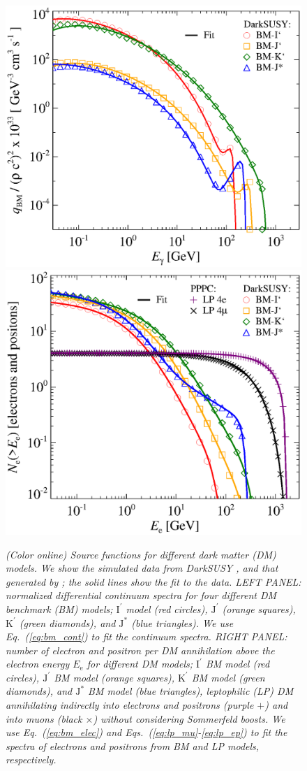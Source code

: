 \documentclass[10pt,aps,pra,reprint,amsmath,amsfonts,amssymb,showpacs,nofootinbib,floatfix]{revtex4-1}
\newcommand{\rmn}{\mathrm}
\newcommand{\ee}{E_\rmn{e}}
\newcommand{\Kp}{\rmn{K}^\prime}
\newcommand{\Ip}{\rmn{I}^\prime}
\newcommand{\Js}{\rmn{J}^*}
\newcommand{\Jp}{\rmn{J}^\prime}
\begin{document}
\begin{figure}
\begin{minipage}{2.0\columnwidth}
 \includegraphics[width=0.49\columnwidth]{figures/fit.ds.flux.bw.eps}
 \includegraphics[width=0.49\columnwidth]{figures/fit.epflux.int.bw.eps}
 \caption{\it (Color online) Source functions for different dark
   matter (DM) models. We show the simulated data from {\sc DarkSUSY}
   \cite{ds}, and that generated by
   \protect\cite{2011JCAP...03..019C,2011JCAP...03..051C}; the solid
   lines show the fit to the data. LEFT PANEL: normalized differential
   continuum spectra for four different DM benchmark (BM) models;
   $\Ip$ model (red circles), $\Jp$ (orange squares), $\Kp$ (green
   diamonds), and $\Js$ (blue triangles). We use Eq.~(\ref{eq:bm_cont})
   to fit the continuum spectra. RIGHT PANEL: number of electron and
   positron per DM annihilation above the electron energy $\ee$ for
   different DM models; $\Ip$ BM model (red circles), $\Jp$ BM model
   (orange squares), $\Kp$ BM model (green diamonds), and $\Js$ BM
   model (blue triangles), leptophilic (LP) DM annihilating indirectly
   into electrons and positrons (purple $+$) and into muons (black
   $\times$) without considering Sommerfeld boosts. We use
   Eq.~(\ref{eq:bm_elec}) and Eqs.~(\ref{eq:lp_mu}-\ref{eq:lp_ep}) to
   fit the spectra of electrons and positrons from BM and LP models,
   respectively.}
 \label{fig:q_DM}
\end{minipage}
\end{figure}
\end{document}
